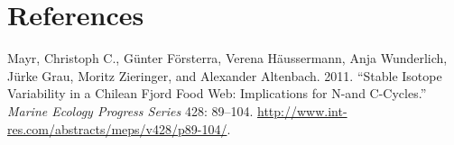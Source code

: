 \section{References}\label{references}


Mayr, Christoph C., Günter Försterra, Verena Häussermann, Anja
Wunderlich, Jürke Grau, Moritz Zieringer, and Alexander Altenbach. 2011.
``Stable Isotope Variability in a Chilean Fjord Food Web: Implications
for N-and C-Cycles.'' \emph{Marine Ecology Progress Series} 428:
89--104. \url{http://www.int-res.com/abstracts/meps/v428/p89-104/}.
